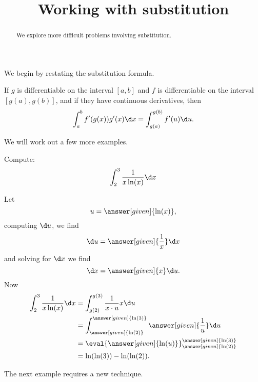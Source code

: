 \documentclass{ximera}
\title[Dig-In:]{Working with substitution}
\begin{document}
\begin{abstract}
We explore more difficult problems involving substitution.
\end{abstract}
\maketitle


We begin by restating the substitution formula.


\begin{theorem} 
If $g$ is differentiable on the interval $[a,b]$ and $f$ is
differentiable on the interval $[g(a),g(b)]$, and if they have continuous derivatives, then
\[
\int_a^b f'(g(x)) g'(x) \d x =\int_{g(a)}^{g(b)} f'(u) \d u.
\]
\end{theorem}


We will work out a few more examples.


\begin{example}
Compute:
\[
\int_{2}^{3} \frac{1}{x\ln(x)} \d x
\]
\begin{explanation}
  Let
  \[
  u =\answer[given]{\ln(x)},
  \]
  computing $\d u$, we find
  \[
  \d u =\answer[given]{\frac{1}{x}}\d x
  \]
  and solving for $\d x$ we find
  \[
  \d x = \answer[given]{x} \d u.
  \]
  Now
\begin{align*}
\int_{2}^{3} \frac{1}{x\ln(x)} \d x &= \int_{g(2)}^{g(3)} \frac{1}{x \cdot u} x \d u  \\
&= \int_{\answer[given]{\ln(2)}}^{\answer[given]{\ln(3)}} \answer[given]{\frac{1}{u}} \d u\\
&= \eval{\answer[given]{\ln(u)}}_{\answer[given]{\ln(2)}}^{\answer[given]{\ln(3)}}\\
& = \ln(\ln(3)) - \ln(\ln(2)).
\end{align*}
\end{explanation}
\end{example}


The next example requires a new technique.
\end{document}

